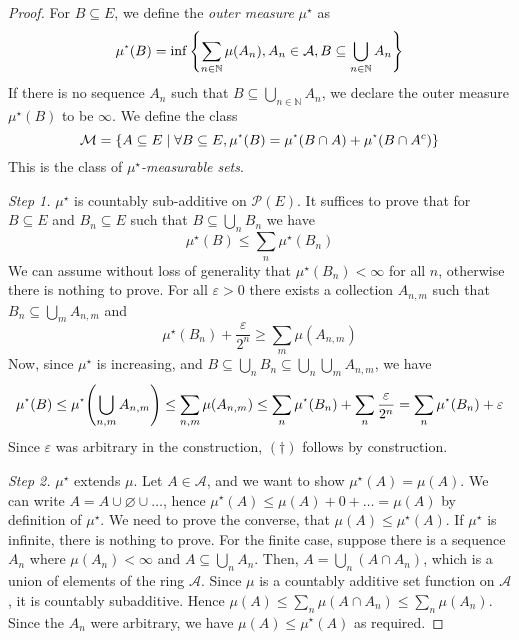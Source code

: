 \begin{proof}
	For \( B \subseteq E \), we define the \emph{outer measure} \( \mu^\star \) as
	\[ \mu^\star(B) = \inf \qty{\sum_{n \in \mathbb N} \mu(A_n), A_n \in \mathcal A, B \subseteq \bigcup_{n \in \mathbb N} A_n} \]
	If there is no sequence \( A_n \) such that \( B \subseteq \bigcup_{n \in \mathbb N} A_n \), we declare the outer measure \( \mu^\star(B) \) to be \( \infty \).
	We define the class
	\[ \mathcal M = \qty{A \subseteq E \mid \forall B \subseteq E,\mu^\star(B) = \mu^\star(B \cap A) + \mu^\star(B \cap A^c)} \]
	This is the class of \emph{\( \mu^\star \)-measurable sets}.

	\emph{Step 1.} \( \mu^\star \) is countably sub-additive on \( \mathcal P(E) \).
	It suffices to prove that for \( B \subseteq E \) and \( B_n \subseteq E \) such that \( B \subseteq \bigcup_n B_n \) we have
	\begin{equation}
		\mu^\star(B) \leq \sum_n \mu^\star(B_n)
		\tag{\(\dagger\)}
	\end{equation}
	We can assume without loss of generality that \( \mu^\star(B_n) < \infty \) for all \( n \), otherwise there is nothing to prove.
	For all \( \varepsilon > 0 \) there exists a collection \( A_{n,m} \) such that \( B_n \subseteq \bigcup_m A_{n,m} \) and
	\[ \mu^\star(B_n) + \frac{\varepsilon}{2^n} \geq \sum_m \mu(A_{n,m}) \]
	Now, since \( \mu^\star \) is increasing, and \( B \subseteq \bigcup_n B_n \subseteq \bigcup_n \bigcup_m A_{n,m} \), we have
	\[ \mu^\star(B) \leq \mu^\star\qty(\bigcup_{n,m} A_{n,m}) \leq \sum_{n,m} \mu(A_{n,m}) \leq \sum_n \mu^\star(B_n) + \sum_n \frac{\varepsilon}{2^n} = \sum_n \mu^\star(B_n) + \varepsilon \]
	Since \( \varepsilon \) was arbitrary in the construction, \( (\dagger) \) follows by construction.

	\emph{Step 2.} \( \mu^\star \) extends \( \mu \).
	Let \( A \in \mathcal A \), and we want to show \( \mu^\star(A) = \mu(A) \).
	We can write \( A = A \cup \varnothing \cup \dots \), hence \( \mu^\star(A) \leq \mu(A) + 0 + \dots = \mu(A) \) by definition of \( \mu^\star \).
	We need to prove the converse, that \( \mu(A) \leq \mu^\star(A) \).
	If \( \mu^\star \) is infinite, there is nothing to prove.
	For the finite case, suppose there is a sequence \( A_n \) where \( \mu(A_n) < \infty \) and \( A \subseteq \bigcup_n A_n \).
	Then, \( A = \bigcup_n (A \cap A_n) \), which is a union of elements of the ring \( \mathcal A \).
	Since \( \mu \) is a countably additive set function on \( \mathcal A \), it is countably subadditive.
	Hence \( \mu(A) \leq \sum_n \mu(A \cap A_n) \leq \sum_n \mu(A_n) \).
	Since the \( A_n \) were arbitrary, we have \( \mu(A) \leq \mu^\star(A) \) as required.


\end{proof}
